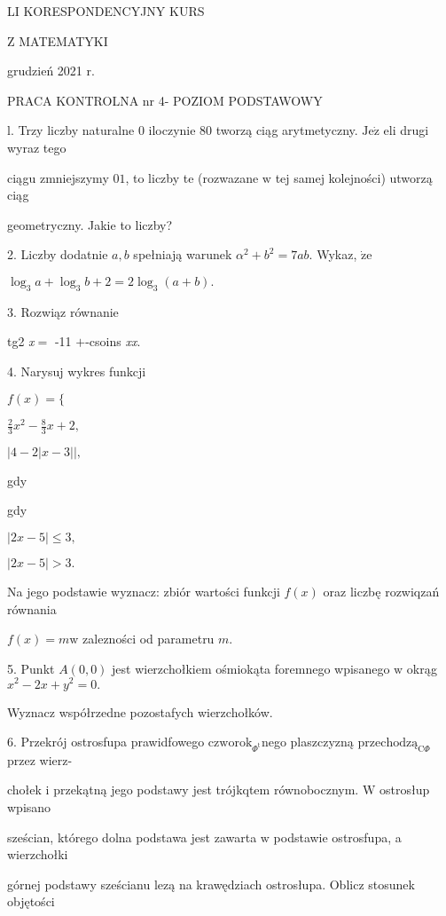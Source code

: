 \documentclass[a4paper,12pt]{article}
\begin{document}
LI KORESPONDENCYJNY KURS

Z MATEMATYKI

grudzień 2021 r.

PRACA KONTROLNA nr 4- POZIOM PODSTAWOWY

l. Trzy liczby naturalne $0$ iloczynie 80 tworzą ciąg arytmetyczny. $\mathrm{J}\mathrm{e}\dot{\mathrm{z}}$ eli drugi wyraz tego

ciągu zmniejszymy $0 1$, to liczby te (rozwazane $\mathrm{w}$ tej samej kolejności) utworzą ciąg

geometryczny. Jakie to liczby?

2. Liczby dodatnie $a, b$ spełniają warunek $\alpha^{2}+b^{2}=7ab$. Wykaz, $\dot{\mathrm{z}}\mathrm{e}$

$\log_{3}a+\log_{3}b+2=2\log_{3}(a+b).$

3. Rozwiąz równanie

tg2 {\it x}$=$ -11 $+$-csoins {\it xx}.

4. Narysuj wykres funkcji

$f(x)=\{$

$\displaystyle \frac{2}{3}x^{2}-\frac{8}{3}x+2,$

$|4-2|x-3||,$

gdy

gdy

$|2x-5|\leq 3,$

$|2x-5|>3.$

Na jego podstawie wyznacz: zbiór wartości funkcji $f(x)$ oraz liczbę rozwiqzań równania

$f(x)=m \mathrm{w}$ zalezności od parametru $m.$

5. Punkt $A(0,0)$ jest wierzchołkiem ośmiokąta foremnego wpisanego $\mathrm{w}$ okrąg $x^{2}-2x+y^{2}=0.$

Wyznacz współrzedne pozostafych wierzchołków.

6. Przekrój ostrosfupa prawidfowego $\mathrm{c}\mathrm{z}\mathrm{w}\mathrm{o}\mathrm{r}\mathrm{o}\mathrm{k}_{\Phi^{\mathrm{t}}}$nego plaszczyzną $\mathrm{p}\mathrm{r}\mathrm{z}\mathrm{e}\mathrm{c}\mathrm{h}\mathrm{o}\mathrm{d}\mathrm{z}\text{ą}_{\mathrm{C}\Phi}$ przez wierz-

chołek $\mathrm{i}$ przekątną jego podstawy jest trójkqtem równobocznym. $\mathrm{W}$ ostrosłup wpisano

sześcian, którego dolna podstawa jest zawarta $\mathrm{w}$ podstawie ostrosfupa, a wierzchołki

górnej podstawy sześcianu lezą na krawędziach ostrosłupa. Oblicz stosunek objętości
\end{document}
